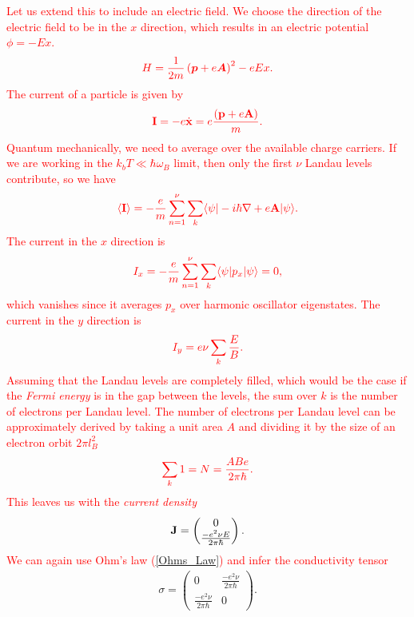  \textcolor{red}{ Let us extend this to include an electric field. We choose the direction of the electric field to be in the $x$ direction, which results in an electric potential $\phi = -Ex$.}
\begin{align}
    \textcolor{red}{ H=\frac{1}{2m}\left(\bm{p} +e \bm{A} \right)^2 -e Ex.}
\end{align}
 \textcolor{red}{ The current of a particle is given by}
\begin{align}
    \textcolor{red}{ {\bf{I}}=-e\dot{{\bf x}}=  e \frac{\left({\bf p}+e{\bf A}\right)}{m}.}
\end{align}
 \textcolor{red}{ Quantum mechanically, we need to average over the available charge carriers. If we are working in the $k_b T \ll \hbar \omega_B$ limit, then only the first $\nu$ Landau levels contribute, so we have}
\begin{align}
    \textcolor{red}{ \langle {\bf I} \rangle = - \frac{e}{m} \sum_{n=1}^{\nu} \sum_{k}  \langle \psi |-i \hbar \nabla +e \bf{A} |\psi \rangle.}
\end{align}
 \textcolor{red}{ The current in the $x$ direction is }
\begin{align}
    \textcolor{red}{ I_x = -\frac{e}{m} \sum_{n=1}^{\nu} \sum_{k} \langle \psi|p_x | \psi \rangle=0,}
\end{align}
 \textcolor{red}{ which vanishes since it averages $p_x$ over harmonic oscillator eigenstates. The current in the $y$ direction is}
\begin{align}
    \textcolor{red}{ I_y = e \nu \sum_{k} \frac{E}{B}.}
\end{align}
 \textcolor{red}{ Assuming that the Landau levels are completely filled, which would be the case if the \textit{Fermi energy} is in the gap between the levels, the sum over $k$ is the number of electrons per Landau level. The number of electrons per Landau level can be approximately derived by taking a unit area $A$ and dividing it by the size of an electron orbit $2 \pi l_B^2$ }
\begin{align}
    \textcolor{red}{ \sum_{k}1 = N = \frac{A B e}{2 \pi \hbar}.}
\end{align}
 \textcolor{red}{ This leaves us with the \textit{current density}}
\begin{align}
    {\bf J} = \begin{pmatrix} 
0\\
        \frac{-e^2 \nu E}{2 \pi \hbar}
    \end{pmatrix}.
\end{align}
 \textcolor{red}{ We can again use Ohm's law (\ref{Ohms_Law}) and infer the conductivity tensor}
\begin{align}
    \sigma = \begin{pmatrix}
        0&\frac{- e^2 \nu }{2\pi \hbar}\\
        \frac{- e^2 \nu }{2\pi \hbar}&0
    \end{pmatrix}.
\end{align}

